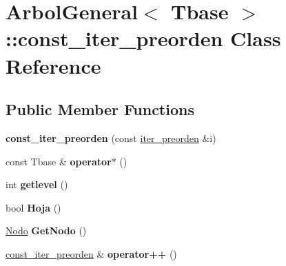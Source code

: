 \hypertarget{class_arbol_general_1_1const__iter__preorden}{}\section{Arbol\+General$<$ Tbase $>$\+:\+:const\+\_\+iter\+\_\+preorden Class Reference}
\label{class_arbol_general_1_1const__iter__preorden}
\subsection*{Public Member Functions}
\begin{DoxyCompactItemize}
\item 
{\bfseries const\+\_\+iter\+\_\+preorden} (const \hyperlink{class_arbol_general_1_1iter__preorden}{iter\+\_\+preorden} \&i)\hypertarget{class_arbol_general_1_1const__iter__preorden_a59b7dbe112d80e3f5b66975dd78c7c3c}{}\label{class_arbol_general_1_1const__iter__preorden_a59b7dbe112d80e3f5b66975dd78c7c3c}

\item 
const Tbase \& {\bfseries operator$\ast$} ()\hypertarget{class_arbol_general_1_1const__iter__preorden_a75ce138afa230a521ff073cce5122394}{}\label{class_arbol_general_1_1const__iter__preorden_a75ce138afa230a521ff073cce5122394}

\item 
int {\bfseries getlevel} ()\hypertarget{class_arbol_general_1_1const__iter__preorden_ab07a9eb538dff6ff21286492dab374bc}{}\label{class_arbol_general_1_1const__iter__preorden_ab07a9eb538dff6ff21286492dab374bc}

\item 
bool {\bfseries Hoja} ()\hypertarget{class_arbol_general_1_1const__iter__preorden_a549b63ae05a4ae7a83e9d5072c0a7484}{}\label{class_arbol_general_1_1const__iter__preorden_a549b63ae05a4ae7a83e9d5072c0a7484}

\item 
\hyperlink{class_arbol_general_a12cc1b74a9095d89bc7334290d332f7a}{Nodo} {\bfseries Get\+Nodo} ()\hypertarget{class_arbol_general_1_1const__iter__preorden_a9d246a539e2a5762bf6704820175f42f}{}\label{class_arbol_general_1_1const__iter__preorden_a9d246a539e2a5762bf6704820175f42f}

\item 
\hyperlink{class_arbol_general_1_1const__iter__preorden}{const\+\_\+iter\+\_\+preorden} \& {\bfseries operator++} ()\hypertarget{class_arbol_general_1_1const__iter__preorden_a33dcbb6f245403d4206b76ec0a6193b7}{}\label{class_arbol_general_1_1const__iter__preorden_a33dcbb6f245403d4206b76ec0a6193b7}


\end{DoxyCompactItemize}
